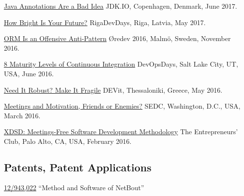 \begin{samepage}
\href{https://youtu.be/cv23Z6xpwDw}{Java Annotations Are a Bad Idea}\newline
JDK.IO, Copenhagen, Denmark, June 2017.
\end{samepage}

\begin{samepage}
\href{https://www.youtube.com/watch?v=IGbteQpTNCA}{How Bright Is Your Future?}\newline
RigaDevDays, Riga, Latvia, May 2017.
\end{samepage}

\begin{samepage}
\href{https://www.youtube.com/watch?v=03PXmPc7Q3g}{ORM Is an Offensive Anti-Pattern}\newline
\O{}redev 2016, Malm\"o, Sweden, November 2016.
\end{samepage}

\begin{samepage}
\href{https://www.youtube.com/watch?v=3dJP_LtUGgg}{8 Maturity Levels of Continuous Integration}\newline
DevOpsDays, Salt Lake City, UT, USA, June 2016.
\end{samepage}

\begin{samepage}
\href{https://www.youtube.com/watch?v=nCGBgI1MNwE}{Need It Robust? Make It Fragile}\newline
DEVit, Thessaloniki, Greece, May 2016.
\end{samepage}

\begin{samepage}
\href{https://www.youtube.com/watch?v=LB_YLWhGrco}{Meetings and Motivation, Friends or Enemies?}\newline
SEDC, Washington, D.C., USA, March 2016.
\end{samepage}

\begin{samepage}
\href{https://www.youtube.com/watch?v=qRZYJGYdrwk}{XDSD: Meetings-Free Software Development Methodology}\newline
The Entrepreneurs' Club, Palo Alto, CA, USA, February 2016.
\end{samepage}

\subsection*{Patents, Patent Applications}

\href{https://patents.google.com/patent/US20120117164}{12/943,022}
``Method and Software of NetBout''

